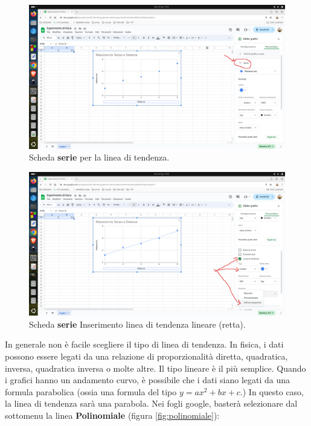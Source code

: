\documentclass[12pt,a4paper,oneside]{book}
\theoremstyle{esercizio}
\begin{document}
\begin{enumerate}
\begin{figure}[h!]
    \centering
    \includegraphics[width=\linewidth]{path_to_image/serie.png} 
    \caption{Scheda \textbf{serie} per la linea di tendenza.}
    \label{fig:serie}
\end{figure}    
  \begin{figure}[h!]
    \centering
    \includegraphics[width=\linewidth]{path_to_image/tendenza.png} 
    \caption{Scheda \textbf{serie} Inserimento linea di tendenza lineare (retta).}
    \label{fig:tendenza}
\end{figure}    
   In generale non è facile scegliere il tipo di linea di tendenza. In fisica, i dati possono essere legati da una relazione di proporzionalità diretta, quadratica, inversa, quadratica inversa o molte altre. Il tipo lineare è il più semplice. Quando i grafici hanno un andamento curvo, è possibile che i dati siano legati da una formula parabolica (ossia una formula del tipo $y=ax^2 +bx +c$.) In questo caso, la linea di tendenza sarà una parabola. Nei fogli google, basterà selezionare dal sottomenu la linea \textbf{Polinomiale} (figura \ref{fig:polinomiale}):
   \begin{figure}[h!]

\end{figure}
\end{enumerate}
\end{document}
